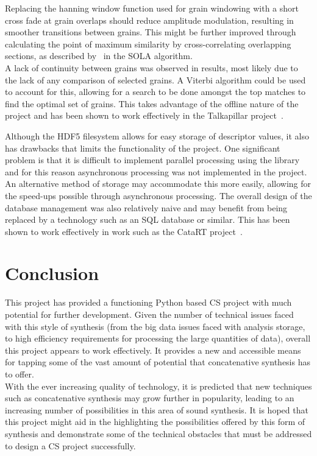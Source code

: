 \documentclass[titlepage]{scrartcl}
\begin{document}
    Replacing the hanning window function used for grain windowing with a short
    cross fade at grain overlaps should reduce amplitude modulation, resulting
    in smoother transitions between grains. This might be further improved
    through calculating the point of maximum similarity by cross-correlating
    overlapping sections, as described by~\textcite[p.191-193]{Zolzer2011} in
    the SOLA algorithm.\\

    A lack of continuity between grains was observed in results, most likely
    due to the lack of any comparison of selected grains. A Viterbi algorithm
    could be used to account for this, allowing for a search to be done amongst
    the top matches to find the optimal set of grains. This takes advantage of
    the offline nature of the project and has been shown to work effectively in
    the Talkapillar project~\parencite{Hueber}.

    Although the HDF5 filesystem allows for easy storage of descriptor values,
    it also has drawbacks that limits the functionality of the project. One
    significant problem is that it is difficult to implement parallel
    processing using the library and for this reason asynchronous processing was
    not implemented in the project. An alternative method of storage may
    accommodate this more easily, allowing for the speed-ups possible through
    asynchronous processing. The overall design of the database management was
    also relatively naive and may benefit from being replaced by a technology
    such as an SQL database or similar. This has been shown to work effectively
    in work such as the CataRT project~\parencite[p.3]{Schwarz2006a}.
    
    \section*{Conclusion}
    This project has provided a functioning Python based CS project with much
    potential for further development. Given the number of technical issues
    faced with this style of synthesis (from the big data issues faced with
    analysis storage, to high efficiency requirements for processing the large
    quantities of data), overall this project appears to work effectively. It
    provides a new and accessible means for tapping some of the vast amount of
    potential that concatenative synthesis has to offer.\\ With the ever
    increasing quality of technology, it is predicted that new techniques such
    as concatenative synthesis may grow further in popularity, leading to an
    increasing number of possibilities in this area of sound synthesis. It is
    hoped that this project might aid in the highlighting the possibilities
    offered by this form of synthesis and demonstrate some of the technical
    obstacles that must be addressed to design a CS project successfully.
\end{document}
